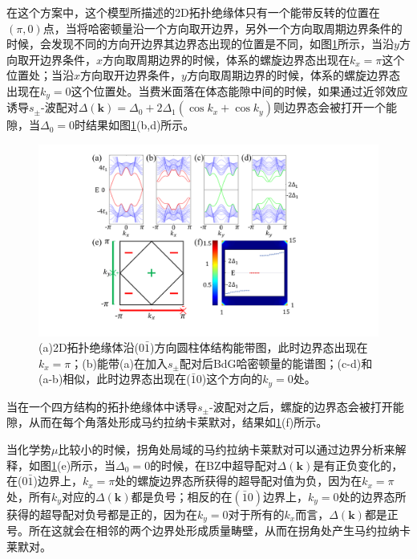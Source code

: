  在这个方案中，这个模型所描述的2D拓扑绝缘体只有一个能带反转的位置在$(\pi,0)$点，当将哈密顿量沿一个方向取开边界，另外一个方向取周期边界条件的时候，会发现不同的方向开边界其边界态出现的位置是不同，如图\ref{fig12}所示，当沿$y$方向取开边界条件，$x$方向取周期边界的时候，体系的螺旋边界态出现在$k_x=\pi$这个位置处；当沿$x$方向取开边界条件，$y$方向取周期边界的时候，体系的螺旋边界态出现在$k_y=0$这个位置处。当费米面落在体态能隙中间的时候，如果通过近邻效应诱导$s_\pm$-波配对$\Delta(\mathbf{k})=\Delta_0+2\Delta_1(\cos k_x+\cos k_y)$则边界态会被打开一个能隙，当$\Delta_0=0$时结果如图\ref{fig12}(b,d)所示。
\begin{figure}[h]
\centering
\includegraphics[scale=0.7]{pic/fig13}
\caption{(a)2D拓扑绝缘体沿($0\bar{1}$)方向圆柱体结构能带图，此时边界态出现在$k_x=\pi$；(b)能带(a)在加入$s_\pm$配对后BdG哈密顿量的能谱图；(c-d)和(a-b)相似，此时边界态出现在($\bar{1}0$)这个方向的$k_y=0$处\cite{re27}。}\label{fig12}
\end{figure}
当在一个四方结构的拓扑绝缘体中诱导$s_\pm$-波配对之后，螺旋的边界态会被打开能隙，从而在每个角落处形成马约拉纳卡莱默对，结果如\ref{fig12}(f)所示。

当化学势$\mu$比较小的时候，拐角处局域的马约拉纳卡莱默对可以通过边界分析来解释，如图\ref{fig12}(e)所示，当$\Delta_0=0$的时候，在BZ中超导配对$\Delta(\mathbf{k})$是有正负变化的，在($0\bar{1}$)边界上，$k_x=\pi$处的螺旋边界态所获得的超导配对值为负，因为在$k_x=\pi$处，所有$k_y$对应的$\Delta(\mathbf{k})$都是负号；相反的在$(\bar{1}0)$边界上，$k_y=0$处的边界态所获得的超导配对负号都是正的，因为在$k_y=0$对于所有的$k_x$而言，$\Delta(\mathbf{k})$都是正号。所在这就会在相邻的两个边界处形成质量畴壁，从而在拐角处产生马约拉纳卡莱默对。

